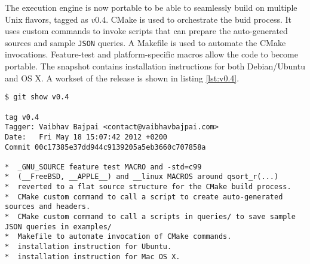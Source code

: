 The execution engine is now portable to be able to seamlessly build on
multiple Unix flavors, tagged as $v0.4$. CMake is used to orchestrate the buid
process. It uses custom commands to invoke scripts that can prepare the
auto-generated  sources and sample \texttt{JSON}
queries. A Makefile is used to automate the CMake invocations. Feature-test
and platform-specific macros allow the code to become portable. The snapshot
contains installation instructions for both Debian/Ubuntu and OS X. A workset
of the release is shown in listing \ref{lst:v0.4}.

\begin{lstlisting}
$ git show v0.4

tag v0.4
Tagger: Vaibhav Bajpai <contact@vaibhavbajpai.com>
Date:   Fri May 18 15:07:42 2012 +0200
Commit 00c17385e37dd944c9139205a5eb3660c707858a

*  _GNU_SOURCE feature test MACRO and -std=c99
*  (__FreeBSD, __APPLE__) and __linux MACROS around qsort_r(...)
*  reverted to a flat source structure for the CMake build process.
*  CMake custom command to call a script to create auto-generated sources and headers.
*  CMake custom command to call a scripts in queries/ to save sample JSON queries in examples/
*  Makefile to automate invocation of CMake commands.
*  installation instruction for Ubuntu.
*  installation instruction for Mac OS X.
\end{lstlisting}


